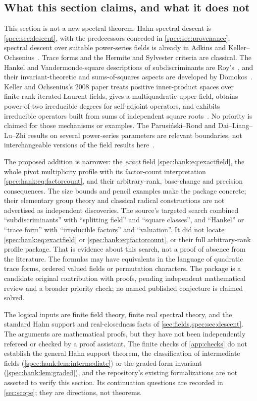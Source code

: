 \documentclass[11pt,a4paper]{article}
\numberwithin{equation}{section}
\theoremstyle{definition}
\theoremstyle{remark}
\begin{document}
\subsection{What this section claims, and what it does not}
\label{spec:hank:sub:scope}

This section is not a new spectral theorem. Hahn spectral descent is
\cref{spec:sec:descent}, with the predecessors conceded in
\cref{spec:sec:provenance}; spectral descent over suitable power-series
fields is already in Adkins and Keller--Ochsenius~\cite{Adkins,KO}. Trace
forms and the Hermite and Sylvester criteria are classical. The Hankel and
Vandermonde-square descriptions of subdiscriminants are Roy's~\cite{Roy}, and
their invariant-theoretic and sums-of-squares aspects are developed by
Domokos~\cite{Domokos}. Keller and Ochsenius's 2008 paper treats positive
inner-product spaces over finite-rank iterated Laurent fields, gives a
multiquadratic upper field, obtains power-of-two irreducible degrees for
self-adjoint operators, and exhibits irreducible operators built from sums of
independent square roots~\cite{KO08}. No priority is claimed for those
mechanisms or examples. The Parusi\'nski--Rond and Dai--Liang--Lu--Zhi
results on several power-series parameters are relevant boundaries, not
interchangeable versions of the field results here~\cite{PR,DLLZ}.

The proposed addition is narrower: the \emph{exact} field
\eqref{spec:hank:eq:exactfield}, the whole pivot multiplicity profile with its
factor-count interpretation \eqref{spec:hank:eq:factorcount}, and their
arbitrary-rank, base-change and precision consequences. The size bounds and
pencil examples make the package concrete; their elementary group theory and
classical radical constructions are not advertised as independent
discoveries. The source's targeted search combined ``subdiscriminants'' with
``splitting field'' and ``square classes'', and ``Hankel'' or ``trace form''
with ``irreducible factors'' and ``valuation''. It did not locate
\eqref{spec:hank:eq:exactfield} or \eqref{spec:hank:eq:factorcount}, or their
full arbitrary-rank profile package. That is evidence about this search, not
a proof of absence from the literature. The formulas may have equivalents in
the language of quadratic trace forms, ordered valued fields or permutation
characters. The package is a candidate original contribution with proofs,
pending independent mathematical review and a broader priority check; no
named published conjecture is claimed solved.

The logical inputs are finite field theory, finite real spectral theory, and
the standard Hahn support and real-closedness facts of
\cref{sec:fields,spec:sec:descent}. The arguments are mathematical proofs, but
they have not been independently refereed or checked by a proof assistant.
The finite checks of \cref{app:checks} do not establish the general Hahn
support theorem, the classification of intermediate fields
(\cref{spec:hank:lem:intermediate}) or the graded-form invariant
(\cref{spec:hank:lem:graded}), and the repository's existing formalizations
are not asserted to verify this section. Its continuation questions are
recorded in \cref{sec:scope}; they are directions, not theorems.
\end{document}
